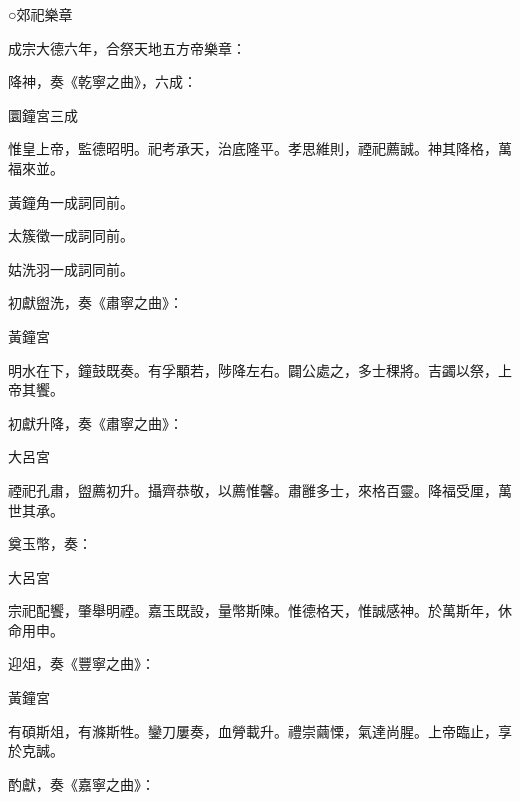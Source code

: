 
\begin{pinyinscope}

 ○郊祀樂章



 成宗大德六年，合祭天地五方帝樂章：



 降神，奏《乾寧之曲》，六成：



 圜鐘宮三成



 惟皇上帝，監德昭明。祀考承天，治底隆平。孝思維則，禋祀薦誠。神其降格，萬福來並。



 黃鐘角一成詞同前。



 太簇徵一成詞同前。



 姑洗羽一成詞同前。



 初獻盥洗，奏《肅寧之曲》：



 黃鐘宮



 明水在下，鐘鼓既奏。有孚顒若，陟降左右。闢公處之，多士稞將。吉蠲以祭，上帝其饗。



 初獻升降，奏《肅寧之曲》：



 大呂宮



 禋祀孔肅，盥薦初升。攝齊恭敬，以薦惟馨。肅雝多士，來格百靈。降福受厘，萬世其承。



 奠玉幣，奏：



 大呂宮



 宗祀配饗，肇舉明禋。嘉玉既設，量幣斯陳。惟德格天，惟誠感神。於萬斯年，休命用申。



 迎俎，奏《豐寧之曲》：



 黃鐘宮



 有碩斯俎，有滌斯牲。鑾刀屢奏，血膋載升。禮崇繭慄，氣達尚腥。上帝臨止，享於克誠。



 酌獻，奏《嘉寧之曲》：




\end{pinyinscope}
